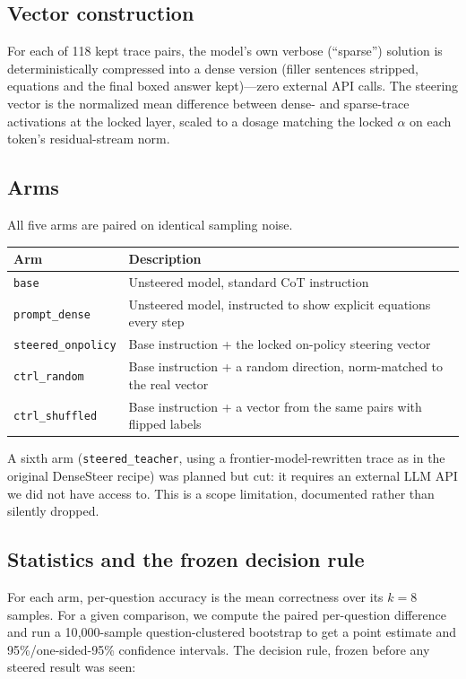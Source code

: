 \documentclass[11pt]{article}
\begin{document}
\subsection{Vector construction}
For each of 118 kept trace pairs, the model's own verbose (``sparse'') solution is
deterministically compressed into a dense version (filler sentences stripped, equations and the
final boxed answer kept)---zero external API calls. The steering vector is the normalized mean
difference between dense- and sparse-trace activations at the locked layer, scaled to a dosage
matching the locked $\alpha$ on each token's residual-stream norm.

\subsection{Arms}
All five arms are paired on identical sampling noise.

\begin{table}[H]
\centering
\begin{tabular}{ll}
\toprule
Arm & Description \\
\midrule
\texttt{base} & Unsteered model, standard CoT instruction \\
\texttt{prompt\_dense} & Unsteered model, instructed to show explicit equations every step \\
\texttt{steered\_onpolicy} & Base instruction + the locked on-policy steering vector \\
\texttt{ctrl\_random} & Base instruction + a random direction, norm-matched to the real vector \\
\texttt{ctrl\_shuffled} & Base instruction + a vector from the same pairs with flipped labels \\
\bottomrule
\end{tabular}
\end{table}

A sixth arm (\texttt{steered\_teacher}, using a frontier-model-rewritten trace as in the original
DenseSteer recipe) was planned but cut: it requires an external LLM API we did not have access
to. This is a scope limitation, documented rather than silently dropped.

\subsection{Statistics and the frozen decision rule}
For each arm, per-question accuracy is the mean correctness over its $k=8$ samples. For a given
comparison, we compute the paired per-question difference and run a 10{,}000-sample
question-clustered bootstrap to get a point estimate and 95\%/one-sided-95\% confidence
intervals. The decision rule, frozen before any steered result was seen:
\end{document}
